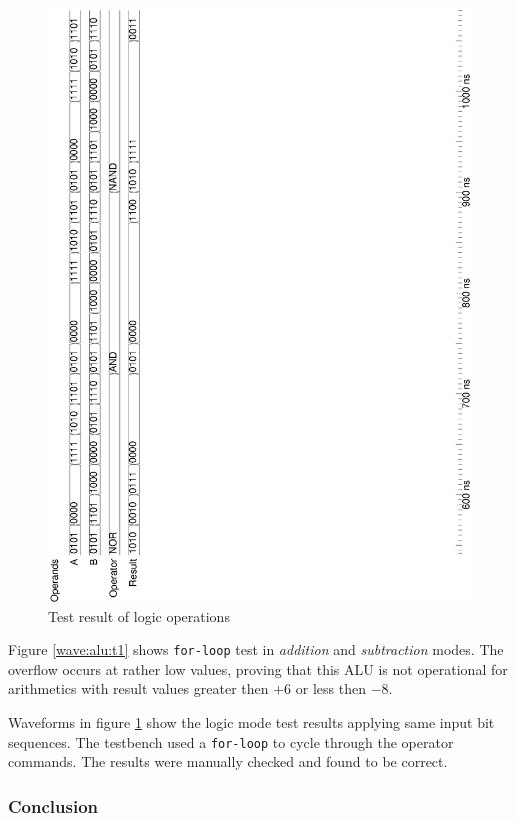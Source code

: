 \documentclass[10pt,a4paper]{report}
\begin{document}
\begin{figure}
\includegraphics[scale=0.5,angle=-90]{graphs/alu_4bit_test2p2.ps}
\caption{\small{Test result of logic operations}} \label{wave:alu:t2}
\end{figure}


 Figure \ref{wave:alu:t1} shows \texttt{for-loop} test
 in \emph{addition} and \emph{subtraction} modes. The
 overflow occurs at rather low values, proving that this
 ALU is not operational for arithmetics with result values
 greater then $+6$ or less then $-8$.

 Waveforms in figure \ref{wave:alu:t2} show the logic
 mode test results applying same input bit sequences.
 The testbench used a \texttt{for-loop} to cycle through
 the operator commands. The results were manually checked
 and found to be correct.

 \subsubsection{Conclusion}
\end{document}
